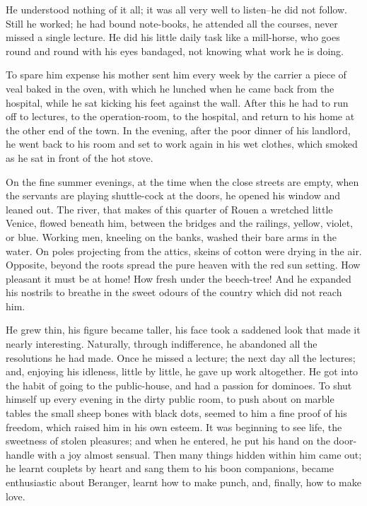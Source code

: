 \documentclass[11pt,twocolumn]{ltugboat}
\begin{document}
He understood nothing of it all; it was all very well to listen--he did
not follow. Still he worked; he had bound note-books, he attended all
the courses, never missed a single lecture. He did his little daily task
like a mill-horse, who goes round and round with his eyes bandaged, not
knowing what work he is doing.

To spare him expense his mother sent him every week by the carrier a
piece of veal baked in the oven, with which he lunched when he came back
from the hospital, while he sat kicking his feet against the wall.
After this he had to run off to lectures, to the operation-room, to the
hospital, and return to his home at the other end of the town. In the
evening, after the poor dinner of his landlord, he went back to his
room and set to work again in his wet clothes, which smoked as he sat in
front of the hot stove.

On the fine summer evenings, at the time when the close streets are
empty, when the servants are playing shuttle-cock at the doors, he
opened his window and leaned out. The river, that makes of this quarter
of Rouen a wretched little Venice, flowed beneath him, between the
bridges and the railings, yellow, violet, or blue. Working men, kneeling
on the banks, washed their bare arms in the water. On poles projecting
from the attics, skeins of cotton were drying in the air. Opposite,
beyond the roots spread the pure heaven with the red sun setting. How
pleasant it must be at home! How fresh under the beech-tree! And he
expanded his nostrils to breathe in the sweet odours of the country
which did not reach him.

He grew thin, his figure became taller, his face took a saddened look
that made it nearly interesting. Naturally, through indifference, he
abandoned all the resolutions he had made. Once he missed a lecture; the
next day all the lectures; and, enjoying his idleness, little by little,
he gave up work altogether. He got into the habit of going to the
public-house, and had a passion for dominoes. To shut himself up every
evening in the dirty public room, to push about on marble tables the
small sheep bones with black dots, seemed to him a fine proof of his
freedom, which raised him in his own esteem. It was beginning to see
life, the sweetness of stolen pleasures; and when he entered, he put
his hand on the door-handle with a joy almost sensual. Then many things
hidden within him came out; he learnt couplets by heart and sang them to
his boon companions, became enthusiastic about Beranger, learnt how to
make punch, and, finally, how to make love.
\end{document}
